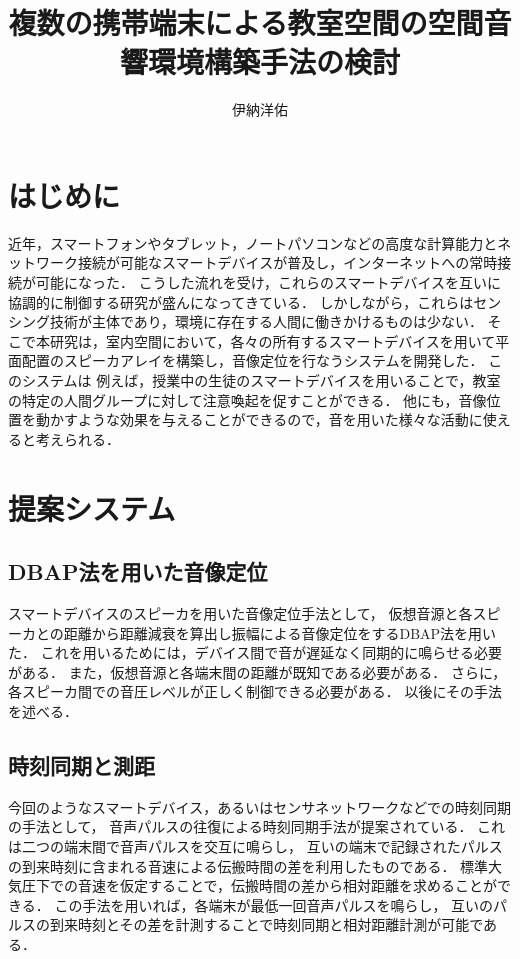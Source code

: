 \documentclass[11pt]{jarticle}
\title{複数の携帯端末による教室空間の空間音響環境構築手法の検討}
\author{伊納洋佑}
\begin{document}
\maketitle

\section{はじめに}

近年，スマートフォンやタブレット，ノートパソコンなどの高度な計算能力とネットワーク接続が可能なスマートデバイスが普及し，インターネットへの常時接続が可能になった．
こうした流れを受け，これらのスマートデバイスを互いに協調的に制御する研究が盛んになってきている\cite{shibata14}．
しかしながら，これらはセンシング技術が主体であり，環境に存在する人間に働きかけるものは少ない．
そこで本研究は，室内空間において，各々の所有するスマートデバイスを用いて平面配置のスピーカアレイを構築し，音像定位を行なうシステムを開発した．
このシステムは
例えば，授業中の生徒のスマートデバイスを用いることで，教室の特定の人間グループに対して注意喚起を促すことができる．
他にも，音像位置を動かすような効果を与えることができるので，音を用いた様々な活動に使えると考えられる．

\section{提案システム}

\subsection{DBAP法を用いた音像定位}

スマートデバイスのスピーカを用いた音像定位手法として，
仮想音源と各スピーカとの距離から距離減衰を算出し振幅による音像定位をするDBAP法を用いた\cite{dbap}．
これを用いるためには，デバイス間で音が遅延なく同期的に鳴らせる必要がある．
また，仮想音源と各端末間の距離が既知である必要がある．
さらに，各スピーカ間での音圧レベルが正しく制御できる必要がある．
以後にその手法を述べる．

\subsection{時刻同期と測距}

今回のようなスマートデバイス，あるいはセンサネットワークなどでの時刻同期の手法として，
音声パルスの往復による時刻同期手法が提案されている\cite{tpsn}．
これは二つの端末間で音声パルスを交互に鳴らし，
互いの端末で記録されたパルスの到来時刻に含まれる音速による伝搬時間の差を利用したものである．
標準大気圧下での音速を仮定することで，伝搬時間の差から相対距離を求めることができる．
この手法を用いれば，各端末が最低一回音声パルスを鳴らし，
互いのパルスの到来時刻とその差を計測することで時刻同期と相対距離計測が可能である．
\end{document}
